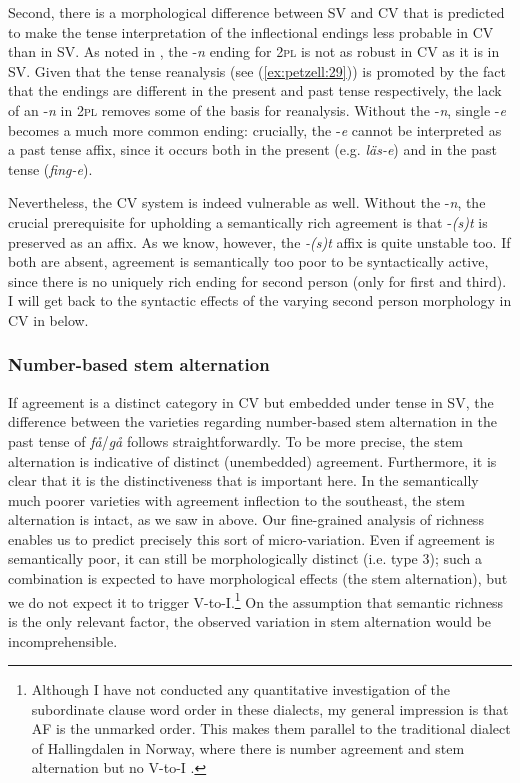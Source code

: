 \documentclass[output=paper,colorlinks,citecolor=brown,draft,draftmode]{langscibook}
\begin{document}
Second, there is a morphological difference between SV and CV that is predicted to make the tense interpretation of the inflectional endings less probable in CV than in SV. As noted in , the -\textit{n} ending for 2\textsc{pl} is not as robust in CV as it is in SV. Given that the tense reanalysis (see (\ref{ex:petzell:29})) is promoted by the fact that the endings are different in the present and past tense respectively, the lack of an -\textit{n} in 2\textsc{pl} removes some of the basis for reanalysis. Without the -\textit{n}, single -\textit{e} becomes a much more common ending: crucially, the -\textit{e} cannot be interpreted as a past tense affix, since it occurs both in the present (e.g. \textit{läs-e}) and in the past tense (\textit{fing-e}).



Nevertheless, the CV system is indeed vulnerable as well. Without the -\textit{n}, the crucial prerequisite for upholding a semantically rich agreement is that -\textit{(s)t} is preserved as an affix. As we know, however, the \textit{-(s)t} affix is quite unstable too. If both are absent, agreement is semantically too poor to be syntactically active, since there is no uniquely rich ending for second person (only for first and third). I will get back to the syntactic effects of the varying second person morphology in CV in  below.


\subsubsection{Number-based stem alternation}\label{sec:petzell:4.3.4}


If agreement is a distinct category in CV but embedded under tense in SV, the difference between the varieties regarding number-based stem alternation in the past tense of \textit{få}/\textit{gå} follows straightforwardly. To be more precise, the stem alternation is indicative of distinct (unembedded) agreement. Furthermore, it is clear that it is the distinctiveness that is important here. In the semantically much poorer varieties with agreement inflection to the southeast, the stem alternation is intact, as we saw in  above. Our fine-grained analysis of richness enables us to predict precisely this sort of micro-variation. Even if agreement is semantically poor, it can still be morphologically distinct (i.e. type 3); such a combination is expected to have morphological effects (the stem alternation), but we do not expect it to trigger V-to-I.\footnote{Although I have not conducted any quantitative investigation of the subordinate clause word order in these dialects, my general impression is that AF is the unmarked order. This makes them parallel to the traditional dialect of Hallingdalen in Norway, where there is number agreement and stem alternation but no V-to-I \citep{Trosterud1989}.}  On the assumption that semantic richness is the only relevant factor, the observed variation in stem alternation would be incomprehensible.
\end{document}
